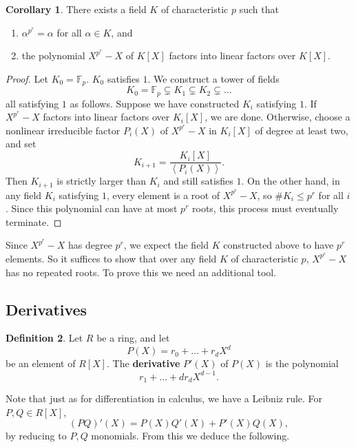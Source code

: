 \documentclass{article}
\newcommand{\F}{\mathbb{F}}
\newcommand{\rb}[1]{\left( #1 \right)}
\renewcommand{\sb}[1]{\left[ #1 \right]}
\newcommand{\ab}[1]{\left\langle #1 \right\rangle}
\theoremstyle{definition}\newtheorem{definition}{Definition}[subsection]
\theoremstyle{definition}\newtheorem{remark}[definition]{Remark}
\theoremstyle{definition}\newtheorem*{example}{Example}
\theoremstyle{definition}\newtheorem*{note}{Note}
\newtheorem{corollary}[definition]{Corollary}
\begin{document}
\begin{corollary}
There exists a field $ K $ of characteristic $ p $ such that
\begin{enumerate}
\item $ \alpha^{p^r} = \alpha $ for all $ \alpha \in K $, and
\item the polynomial $ X^{p^r} - X $ of $ K\sb{X} $ factors into linear factors over $ K\sb{X} $.
\end{enumerate}
\end{corollary}

\begin{proof}
Let $ K_0 = \F_p $. $ K_0 $ satisfies $ 1 $. We construct a tower of fields
$$ K_0 = \F_p \subsetneq K_1 \subsetneq K_2 \subsetneq \dots $$
all satisfying $ 1 $ as follows. Suppose we have constructed $ K_i $ satisfying $ 1 $. If $ X^{p^r} - X $ factors into linear factors over $ K_i\sb{X} $, we are done. Otherwise, choose a nonlinear irreducible factor $ P_i\rb{X} $ of $ X^{p^r} - X $ in $ K_i\sb{X} $ of degree at least two, and set
$$ K_{i + 1} = \dfrac{K_i\sb{X}}{\ab{P_i\rb{X}}}. $$
Then $ K_{i + 1} $ is strictly larger than $ K_i $ and still satisfies $ 1 $. On the other hand, in any field $ K_i $ satisfying $ 1 $, every element is a root of $ X^{p^r} - X $, so $ \#K_i \le p^r $ for all $ i $. Since this polynomial can have at most $ p^r $ roots, this process must eventually terminate.
\end{proof}

Since $ X^{p^r} - X $ has degree $ p^r $, we expect the field $ K $ constructed above to have $ p^r $ elements. So it suffices to show that over any field $ K $ of characteristic $ p $, $ X^{p^r} - X $ has no repeated roots. To prove this we need an additional tool.

\subsection{Derivatives}

\begin{definition}
Let $ R $ be a ring, and let
$$ P\rb{X} = r_0 + \dots + r_dX^d $$
be an element of $ R\sb{X} $. The \textbf{derivative} $ P'\rb{X} $ of $ P\rb{X} $ is the polynomial
$$ r_1 + \dots + dr_dX^{d - 1}. $$
\end{definition}

Note that just as for differentiation in calculus, we have a Leibniz rule. For $ P, Q \in R\sb{X} $,
$$ \rb{PQ}'\rb{X} = P\rb{X}Q'\rb{X} + P'\rb{X}Q\rb{X}, $$
by reducing to $ P, Q $ monomials. From this we deduce the following.
\end{document}
